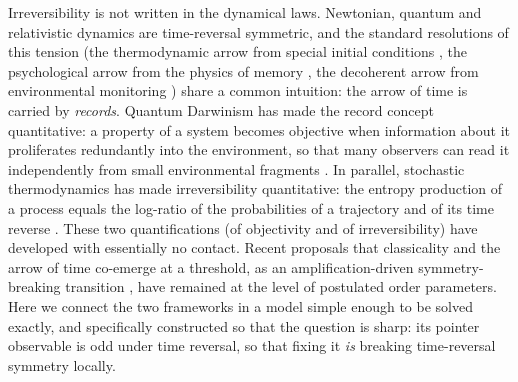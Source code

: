 \documentclass[11pt]{article}
\begin{document}
Irreversibility is not written in the dynamical laws. Newtonian, quantum and relativistic dynamics are time-reversal symmetric, and the standard resolutions of this tension (the thermodynamic arrow from special initial conditions \cite{Albert2000}, the psychological arrow from the physics of memory \cite{Mlodinow2014}, the decoherent arrow from environmental monitoring \cite{Zurek2003,Guff2025}) share a common intuition: the arrow of time is carried by \emph{records}. Quantum Darwinism has made the record concept quantitative: a property of a system becomes objective when information about it proliferates redundantly into the environment, so that many observers can read it independently from small environmental fragments \cite{Zurek2009,Riedel2012,Zurek2022}. In parallel, stochastic thermodynamics has made irreversibility quantitative: the entropy production of a process equals the log-ratio of the probabilities of a trajectory and of its time reverse \cite{Maes2003,Callens2004,Landi2021}. These two quantifications (of objectivity and of irreversibility) have developed with essentially no contact. Recent proposals that classicality and the arrow of time co-emerge at a threshold, as an amplification-driven symmetry-breaking transition \cite{Aharonov2000}, have remained at the level of postulated order parameters. Here we connect the two frameworks in a model simple enough to be solved exactly, and specifically constructed so that the question is sharp: its pointer observable is odd under time reversal, so that fixing it \emph{is} breaking time-reversal symmetry locally.
\end{document}
